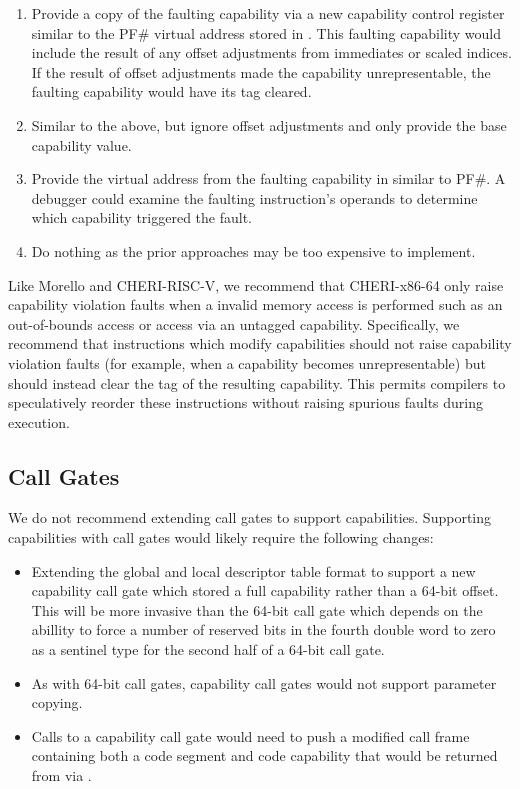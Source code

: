 \begin{enumerate}
\item Provide a copy of the faulting capability via a new capability
  control register similar to the PF\# virtual address stored in
  \CRTWO{}.  This faulting capability would include the result of any
  offset adjustments from immediates or scaled indices.  If the result
  of offset adjustments made the capability unrepresentable, the
  faulting capability would have its tag cleared.
\item Similar to the above, but ignore offset adjustments and only
  provide the base capability value.
\item Provide the virtual address from the faulting capability in
  \CRTWO{} similar to PF\#.  A debugger could examine the faulting
  instruction's operands to determine which capability triggered the fault.
\item Do nothing as the prior approaches may be too expensive to
  implement.
\end{enumerate}

Like Morello and CHERI-RISC-V, we recommend that CHERI-x86-64
only raise capability violation faults when a invalid memory access is
performed such as an out-of-bounds access or access via an untagged
capability.  Specifically, we recommend that instructions which modify
capabilities should not raise capability violation faults (for
example, when a capability becomes unrepresentable) but should instead
clear the tag of the resulting capability.  This permits compilers to
speculatively reorder these instructions without raising spurious
faults during execution.

\subsection{Call Gates}

We do not recommend extending call gates to support capabilities.
Supporting capabilities with call gates would likely require the
following changes:

\begin{itemize}
  \item Extending the global and local descriptor table format to
    support a new capability call gate which stored a full capability
    rather than a 64-bit offset.  This will be more invasive than the
    64-bit call gate which depends on the abillity to force a number
    of reserved bits in the fourth double word to zero as a sentinel
    type for the second half of a 64-bit call gate.

  \item As with 64-bit call gates, capability call gates would not support
    parameter copying.

  \item Calls to a capability call gate would need to push a modified
    call frame containing both a code segment and code capability that
    would be returned from via .
\end{itemize}

